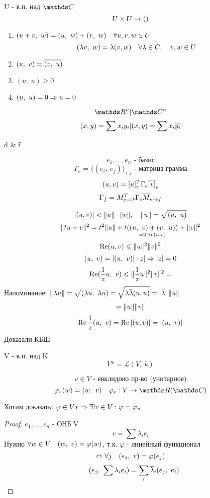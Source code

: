 \documentclass[12pt, fleqn]{article}
\begin{document}
	\tableofcontents
	\newpage
	
	
	
	
	
	

	\begin{definition}
		U - в.п. над $\CC$\\
		\[U \times U \rightarrow ()\]
		\begin{enumerate}
			\item $(u+v,\ w) = (u,\ w) + (v,\ w)\quad \forall u,v,w \in U$
			\[(\lambda v,\ w) = \lambda(v,w)\quad \forall \lambda \in C,\quad v,w \in U\]
			\item $(u,\ v) = \ol{(v,\ u)}$
			\item $(u,\ u) \geqslant 0$
			\item $(u,\ u) = 0 \Rightarrow u = 0$
		\end{enumerate}
	\end{definition}

	\begin{Example}
		\[\R^n | \CC^n\]
		\[(x,y) = \sum x_i y_i | (x,y) = \sum x_i \overline{y_i}\]
		\begin{tabular}[c|c]
			d & f
		\end{tabular}
	\end{Example}

	\[e_1,...,e_n \text{ - базис}\]
	\[\Gamma_e = \{(e_i,\ e_j)\}_{i,j} \text{ - матрица грамма}\]
	\[(u,v) = [u]_e^T \Gamma_e \overline{[v]}_e\]
	\[\Gamma_f = M_{e \rightarrow f}^T \Gamma_e \overline{M}_{e \rightarrow f}\]

	\[|(u,v)| < \lVert u \rVert \cdot \lVert v \rVert,\quad \lVert u \rVert = \sqrt{(u,\ u)}\]
	\[\lVert tu + v \rVert^2 = t^2 \lVert u \rVert + t(\underset{=2\mathop{\rm Re}\nolimits (u,v)}{(u,\ v) + (v,\ u)}) + \lVert v \rVert^2\]
	\[\mathop{\rm Re}\nolimits (u,v) \leqslant \lVert u \rVert^2 \lVert v \rVert^2\]
	\[(u,\ v) = |(u,\ v)| \cdot z |\Rightarrow |z| = 0\]
	\[\mathop{\rm Re}\nolimits (\frac{1}{z} u,\ v) \leqslant \lVert \frac{1}{z} u \rVert^2 \lVert v \rVert^2 = \]
	Напоминание: $\lVert \lambda u \rVert = \sqrt{(\lambda u,\ \lambda u)} = \sqrt{\lambda \overline{\lambda} (u,u)} =\left|\lambda\right| \lVert u \rVert$
	\[= \lVert u \rVert \lVert v \rVert\]
	\[\mathop{\rm Re}\nolimits \frac{1}{z}(u,\ v) = \mathop{\rm Re}\nolimits \left|(u,v)\right| = \left|(u,\ v)\right|\]
	Доказали КБШ

	\begin{definition}
		V - в.п. над K
		\[V* = \mathscr{L}(V,\ k)\]
	\end{definition}
	\begin{Example}
		\[v \in V \text{ - евклидово пр-во (унитарное)}\]
		\[\varphi_v(w) = (w,\ v) \q \varphi_v: V \ra \R (\CC)\]
	\end{Example}
	Хотим доказать: $\varphi \in V* \Rightarrow \exists! v\in V: \varphi = \varphi_v$
	\begin{proof}
		$e_1,...,e_n$ - ОНБ V
		\[v = \sum \lambda_i  e_i\]
		Нужно $\forall w \in V \quad (w,\ v) = \varphi(w)$, т.к. $\varphi$ - линейный функционал
		\[\Leftrightarrow \forall j \quad (e_j,\ v) = \varphi(e_j)\]
		\[\q (e_j,\ \sum \lambda_i e_i) = \sum_i \ol{\lambda}_i (e_j,\ e_i)\]
	\end{proof}
\end{document}
